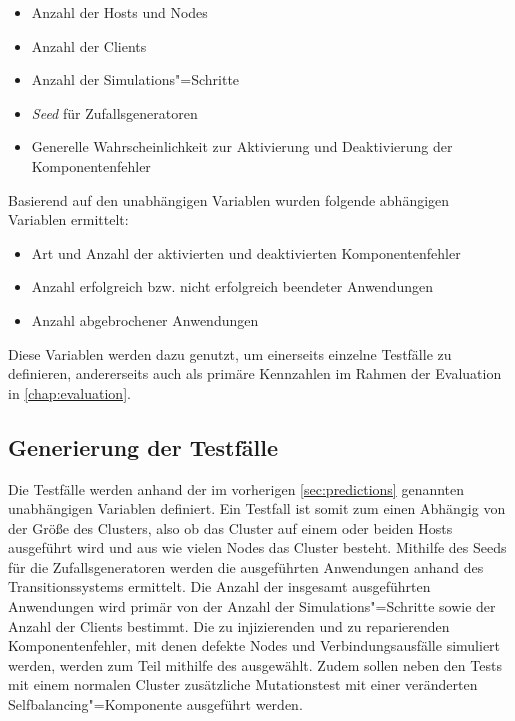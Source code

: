 \begin{itemize}
    \item Anzahl der Hosts und Nodes
    \item Anzahl der Clients
    \item Anzahl der Simulations"=Schritte
    \item \emph{Seed} für Zufallsgeneratoren
    \item Generelle Wahrscheinlichkeit zur Aktivierung und Deaktivierung der Komponentenfehler
\end{itemize}

Basierend auf den unabhängigen Variablen wurden folgende abhängigen Variablen ermittelt:

\begin{itemize}
    \item Art und Anzahl der aktivierten und deaktivierten Komponentenfehler
    \item Anzahl erfolgreich bzw. nicht erfolgreich beendeter Anwendungen
    \item Anzahl abgebrochener Anwendungen
\end{itemize}

Diese Variablen werden dazu genutzt, um einerseits einzelne Testfälle zu definieren, andererseits auch als primäre Kennzahlen im Rahmen der Evaluation in \autoref{chap:evaluation}.

\subsection{Generierung der Testfälle}
\label{sec:testcaseGeneration}

Die Testfälle werden anhand der im vorherigen \autoref{sec:predictions} genannten unabhängigen Variablen definiert.
Ein Testfall ist somit zum einen Abhängig von der Größe des Clusters, also ob das Cluster auf einem oder beiden Hosts ausgeführt wird und aus wie vielen Nodes das Cluster besteht.
Mithilfe des Seeds für die Zufallsgeneratoren werden die ausgeführten Anwendungen anhand des Transitionssystems ermittelt.
Die Anzahl der insgesamt ausgeführten Anwendungen wird primär von der Anzahl der Simulations"=Schritte sowie der Anzahl der Clients bestimmt.
Die zu injizierenden und zu reparierenden Komponentenfehler, mit denen defekte Nodes und Verbindungsausfälle simuliert werden, werden zum Teil mithilfe des ausgewählt.
Zudem sollen neben den Tests mit einem normalen Cluster zusätzliche Mutationstest mit einer veränderten Selfbalancing"=Komponente ausgeführt werden.

